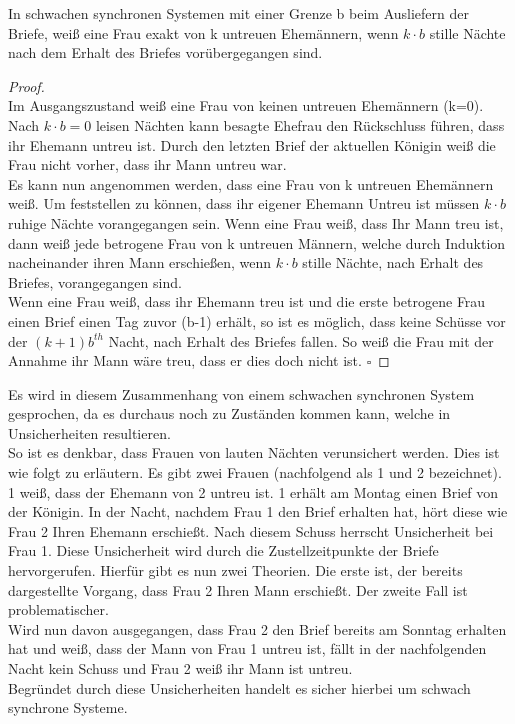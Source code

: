 \begin{satz} 
\label{prop_weak_sync}
In schwachen synchronen Systemen mit einer Grenze b beim Ausliefern der Briefe, weiß eine Frau exakt von k untreuen Ehemännern, wenn $k \cdot b$ stille Nächte nach dem Erhalt des Briefes vorübergegangen sind.
\end{satz}
\begin{proof}\hfill\\
Im Ausgangszustand weiß eine Frau von keinen untreuen Ehemännern (k=0). Nach $k \cdot b=0$ leisen Nächten kann besagte Ehefrau den Rückschluss führen, dass ihr Ehemann untreu ist. Durch den letzten Brief der aktuellen Königin weiß die Frau nicht vorher, dass ihr Mann untreu war. \\Es kann nun angenommen werden, dass eine Frau von k untreuen Ehemännern weiß. Um feststellen zu können, dass ihr eigener Ehemann Untreu ist müssen $k \cdot b$ ruhige Nächte vorangegangen sein. Wenn eine Frau weiß, dass Ihr Mann treu ist, dann weiß jede betrogene Frau von k untreuen Männern, welche durch Induktion nacheinander ihren Mann erschießen, wenn $k \cdot b$ stille Nächte, nach Erhalt des Briefes, vorangegangen sind.\\ Wenn eine Frau weiß, dass ihr Ehemann treu ist und die erste betrogene Frau einen Brief einen Tag zuvor (b-1) erhält, so ist es möglich, dass keine Schüsse vor der $(k+1)b^{th}$ Nacht, nach Erhalt des Briefes fallen. So weiß die Frau mit der Annahme ihr Mann wäre treu, dass er dies doch nicht ist.
$\square$
\end{proof}
Es wird in diesem Zusammenhang von einem schwachen synchronen System gesprochen, da es durchaus noch zu Zuständen kommen kann, welche in Unsicherheiten resultieren. \\So ist es denkbar, dass Frauen von lauten Nächten verunsichert werden. Dies ist wie folgt zu erläutern. Es gibt zwei Frauen (nachfolgend als 1 und 2 bezeichnet). 1 weiß, dass der Ehemann von 2 untreu ist. 1 erhält am Montag einen Brief von der Königin. In der Nacht, nachdem Frau 1 den Brief erhalten hat, hört diese wie Frau 2 Ihren Ehemann erschießt. Nach diesem Schuss herrscht Unsicherheit bei Frau 1. Diese Unsicherheit wird durch die Zustellzeitpunkte der Briefe hervorgerufen. Hierfür gibt es nun zwei Theorien. Die erste ist, der bereits dargestellte Vorgang, dass Frau 2 Ihren Mann erschießt. Der zweite Fall ist problematischer.\\ Wird nun davon ausgegangen, dass Frau 2 den Brief bereits am Sonntag erhalten hat und weiß, dass der Mann von Frau 1 untreu ist, fällt in der nachfolgenden Nacht kein Schuss und Frau 2 weiß ihr Mann ist untreu. \\
Begründet durch diese Unsicherheiten handelt es sicher hierbei um schwach synchrone Systeme. 

